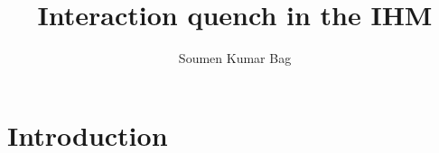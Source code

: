 \documentclass{article}
\title{\bf{Interaction quench in the IHM}}
\author{Soumen Kumar Bag}
\begin{document}
\maketitle
\section{Introduction}





\end{document}
